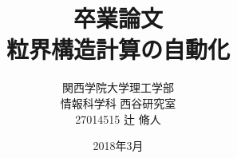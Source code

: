 \title{卒業論文\\粒界構造計算の自動化}
\author{関西学院大学理工学部\\情報科学科 西谷研究室\\27014515 辻 脩人}
\date{2018年3月}

\maketitle
\newpage
